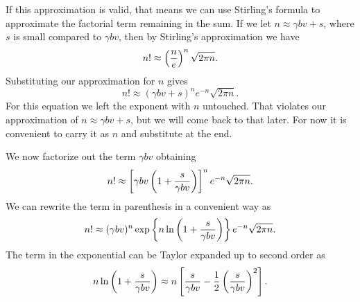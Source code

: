 If this approximation is valid, that means we can use Stirling's formula to
approximate the factorial term remaining in the sum. If we let
$n \approx \gamma b v + s$, where $s$ is small compared to $\gamma b v$, then by
Stirling's approximation we have
\begin{equation}
  n! \approx \left( {n \over e} \right)^n \sqrt{2 \pi n}.
\end{equation}
Substituting our approximation for $n$ gives
\begin{equation}
  n! \approx (\gamma b v + s)^n e^{-n} \sqrt{2 \pi n}.
\end{equation}
For this equation we left the exponent with $n$ untouched. That violates our
approximation of $n \approx \gamma b v + s$, but we will come back to that
later. For now it is convenient to carry it as $n$ and substitute at the end.

We now factorize out the term $\gamma b v$ obtaining
\begin{equation}
  n! \approx \left[ \gamma b v \left( 1 + {s \over \gamma b v} \right) \right]^n
  e^{-n} \sqrt{2 \pi n}.
\end{equation}
We can rewrite the term in parenthesis in a convenient way as
\begin{equation}
  n! \approx (\gamma b v)^n
  \exp \left\{ n \ln \left( 1 + {s \over \gamma b v} \right) \right\}
  e^{-n} \sqrt{2 \pi n}.
\end{equation}
The term in the exponential can be Taylor expanded up to second order as
\begin{equation}
n \ln \left( 1 + {s \over \gamma b v} \right) \approx
n \left[ {s \over \gamma b v}
- {1 \over 2} \left( {s \over \gamma b v}  \right)^2 \right].
\end{equation}

